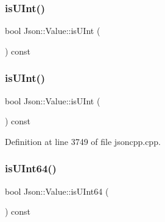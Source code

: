 \hypertarget{class_json_1_1_value_abdda463d3269015f883587349726cfbc}{}\label{class_json_1_1_value_abdda463d3269015f883587349726cfbc} 
\subsubsection{\texorpdfstring{is\+U\+Int()}{isUInt()}\hspace{0.1cm}{\footnotesize\ttfamily [1/2]}}
{\footnotesize\ttfamily bool Json\+::\+Value\+::is\+U\+Int (\begin{DoxyParamCaption}{ }\end{DoxyParamCaption}) const}

\hypertarget{class_json_1_1_value_abdda463d3269015f883587349726cfbc}{}\label{class_json_1_1_value_abdda463d3269015f883587349726cfbc} 
\subsubsection{\texorpdfstring{is\+U\+Int()}{isUInt()}\hspace{0.1cm}{\footnotesize\ttfamily [2/2]}}
{\footnotesize\ttfamily bool Json\+::\+Value\+::is\+U\+Int (\begin{DoxyParamCaption}{ }\end{DoxyParamCaption}) const}



Definition at line 3749 of file jsoncpp.\+cpp.

\hypertarget{class_json_1_1_value_a883576e35cb03a785258edb56777a2de}{}\label{class_json_1_1_value_a883576e35cb03a785258edb56777a2de} 
\subsubsection{\texorpdfstring{is\+U\+Int64()}{isUInt64()}\hspace{0.1cm}{\footnotesize\ttfamily [1/2]}}
{\footnotesize\ttfamily bool Json\+::\+Value\+::is\+U\+Int64 (\begin{DoxyParamCaption}{ }\end{DoxyParamCaption}) const}

\hypertarget{class_json_1_1_value_a883576e35cb03a785258edb56777a2de}{}\label{class_json_1_1_value_a883576e35cb03a785258edb56777a2de} 
